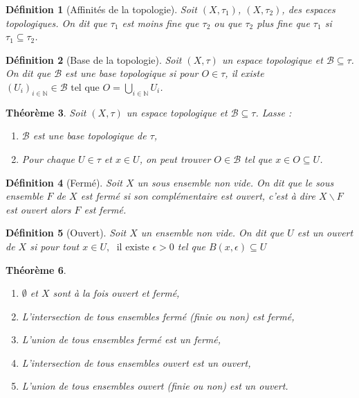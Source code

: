 \documentclass[a4paper, 12pt]{report}
\theoremstyle{break}
\newtheorem{defin}{Définition}[section]
\newtheorem{theo}[defin]{Théorème}
\begin{document}
\begin{defin}[Affinités de la topologie]
      Soit $(X, \tau_{1})$, $(X, \tau_{2})$, des espaces topologiques. On dit que $\tau_{1}$ est moins fine que $\tau_{2}$ ou que $\tau_{2}$ plus fine que $\tau_{1}$ si $\tau_{1} \subseteq \tau_{2}$.
\end{defin}

\begin{defin}[Base de la topologie]
      Soit $(X, \tau)$ un espace topologique et $\mathcal{B} \subseteq \tau$. On dit que $\mathcal{B}$ est une base topologique si pour $O \in \tau$, il existe $(U_{i})_{i \in \mathbb{N}} \in \mathcal{B}\mbox{ tel que } O = \displaystyle \bigcup_{i \in \mathbb{N}} U_{i}$. 
\end{defin}

\begin{theo}
      Soit $(X, \tau)$ un espace topologique et $\mathcal{B} \subseteq \tau$. Lasse :
      \begin{enumerate}
               \item $\mathcal{B}$ est une base topologique de $\tau$,
               \item Pour chaque $U \in \tau$ et $x \in U$, on peut trouver $O \in \mathcal{B}$ tel que $x \in O \subseteq U$.
      \end{enumerate}
\end {theo}

\begin{defin}[Fermé]
      Soit $X$ un sous ensemble non vide. On dit que le sous ensemble $F$ de $X$ est fermé si son complémentaire est ouvert, c'est à dire $X\backslash F$ est ouvert alors $F$ est fermé.
\end{defin}

\begin{defin}[Ouvert]
      Soit $X$ un ensemble non vide. On dit que $U$ est un ouvert de $X$ si pour tout $x \in U, \; \mbox{ il existe }\epsilon >0$  tel que $B(x,\epsilon) \subseteq U$
\end{defin}

\begin{theo}
     \begin{enumerate}
           \item $\emptyset$ et $X$ sont à la fois ouvert et fermé,
           \item L'intersection de tous ensembles fermé (finie ou non) est fermé,
           \item L'union de tous ensembles fermé est un fermé,
           \item L'intersection de tous ensembles ouvert est un ouvert,
           \item L'union de tous ensembles ouvert (finie ou non) est un ouvert.
     \end{enumerate}
\end{theo}
\end{document}
